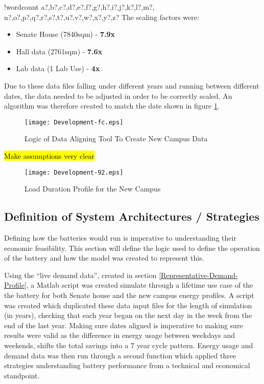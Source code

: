 \documentclass[fontsize=9.5pt]{extarticle}
\numberwithin{figure}{section} %
\providecommand{\tightlist}{%
  \setlength{\itemsep}{0pt}\setlength{\parskip}{0pt}}
\newcounter{words}
\newenvironment{counted}{%
  \setcounter{words}{0}
  \SearchList!{wordcount}{\stepcounter{words}}
    {a?,b?,c?,d?,e?,f?,g?,h?,i?,j?,k?,l?,m?,
    n?,o?,p?,q?,r?,s?,t?,u?,v?,w?,x?,y?,z?}
  \UndoBoundary{'}
  \SearchOrder{p;}}{%
  \StopSearching}
\begin{document}
\begin{counted}
The scaling factors were:

\begin{itemize}
\tightlist
\item
  Senate House (7840sqm) - \textbf{7.9x}
\item
  Hall data (2761sqm) - \textbf{7.6x}
\item
  Lab data (1 Lab Use) - \textbf{4x}
\end{itemize}

Due to these data files falling under different years and running
between different dates, the data needed to be adjusted in order to be
correctly scaled. An algorithm was therefore created to match the date
shown in figure \ref{Development-fc}.

\begin{figure}[H]
 \centering
 \texttt{[image: Development-fc.eps]}
 \caption{Logic of Data Aligning Tool To Create New Campus Data}
 \label{Development-fc}
 \end{figure}

\hl{Make assumptions very clear}

\begin{figure}[H]
 \centering
 \texttt{[image: Development-92.eps]}
 \caption{Load Duration Profile for the New Campus}
 \label{Development-92}
 \end{figure}

\subsection{Definition of System Architectures /
Strategies}\label{definition-of-system-architectures-strategies}

Defining how the batteries would run is imperative to understanding
their economic feasibility. This section will define the logic used to
define the operation of the battery and how the model was created to
represent this.

Using the ``live demand data'', created in section
\ref{Representative-Demand-Profile}, a Matlab script was created
simulate through a lifetime use case of the the battery for both Senate
house and the new campus energy profiles. A script was created which
duplicated these data input files for the length of simulation (in
years), checking that each year began on the next day in the week from
the end of the last year. Making sure dates aligned is imperative to
making sure results were valid as the difference in energy usage between
weekdays and weekends, shifts the total savings into a 7 year cycle
pattern. Energy usage and demand data was then run through a second
function which applied three strategies understanding battery
performance from a technical and economical standpoint.


\end{counted}
\end{document}
